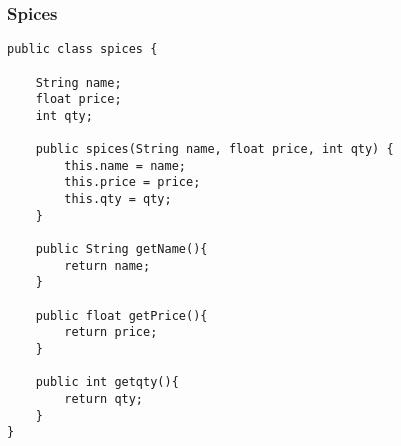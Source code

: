 \documentclass[10pt]{article}
\begin{document}
\subsubsection{Spices}
\lstset{numbers=left, numberstyle=\tiny, stepnumber=1, numbersep=5pt, basicstyle=\footnotesize\ttfamily}
\begin{lstlisting}[frame=single, ]  
public class spices {

    String name;
    float price;
    int qty;

    public spices(String name, float price, int qty) {
        this.name = name;
        this.price = price;
        this.qty = qty;
    }

    public String getName(){
        return name;
    }

    public float getPrice(){
        return price;
    }

    public int getqty(){
        return qty;
    }
}
\end{lstlisting}
\end{document}
